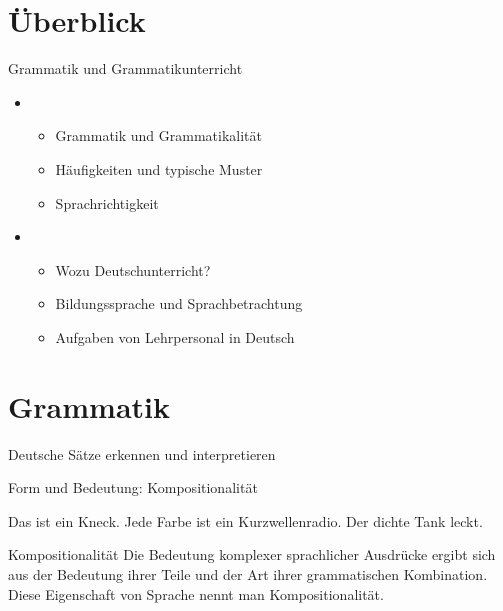 \section{Überblick}

\begin{frame}
  {Grammatik und Grammatikunterricht}
  \onslide<+->
  \begin{itemize}[<+->]
    \item {}
      \begin{itemize}
        \item Grammatik und Grammatikalität
        \item Häufigkeiten und typische Muster
        \item Sprachrichtigkeit
      \end{itemize}
      \Zeile
    \item {}
      \begin{itemize}
        \item Wozu Deutschunterricht?
        \item Bildungssprache und Sprachbetrachtung
        \item Aufgaben von Lehrpersonal in Deutsch
      \end{itemize}
  \end{itemize}
\end{frame}


\section{Grammatik}

\begin{frame}
  {Deutsche Sätze erkennen und interpretieren}
  \onslide<+->
  \onslide<+->
  \begin{exe}
    \onslide<+->
    \onslide<+->
    \onslide<+->
    \onslide<+->
    \Zeile
  \end{exe}
\end{frame}


\begin{frame}
  {Form und Bedeutung: Kompositionalität}
  \onslide<+->
  \onslide<+->
  \begin{exe}
    \ex Das ist ein Kneck.
    \onslide<+->
    \Zeile
  \ex Jede Farbe ist ein Kurzwellenradio.
  \ex Der dichte Tank leckt.
\end{exe}
    \Zeile
  \onslide<+->

  \Large\begin{block}{Kompositionalität}
    Die Bedeutung komplexer sprachlicher Ausdrücke ergibt sich aus der Bedeutung ihrer Teile und der Art ihrer grammatischen Kombination. 
    Diese Eigenschaft von Sprache nennt man Kompositionalität.
  \end{block}
\end{frame}

